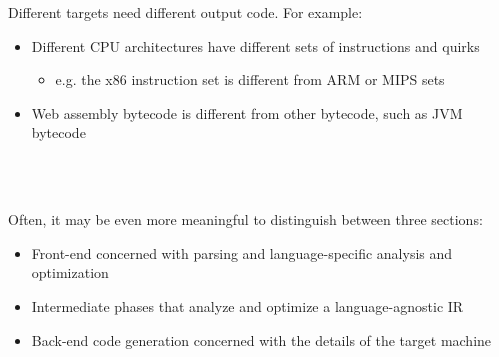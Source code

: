 \documentclass[../index.tex]{subfiles}
\begin{document}
\begin{frame}{\currenttitle}
  Different targets need different output code. For example:

  \begin{itemize}
    \item<2-> Different CPU architectures have different sets of instructions and quirks
      \begin{itemize}
        \item e.g. the x86 instruction set is different from ARM or MIPS sets
      \end{itemize}
    \item<3-> Web assembly bytecode is different from other bytecode, such as JVM bytecode
  \end{itemize}

  \vspace*{1em}
\end{frame}

\begin{frame}{\currenttitle}
   \\[2em]

   \\[1em]
    
  \hspace*{2em}

\end{frame}

\begin{frame}{\currenttitle}
  Often, it may be even more meaningful to distinguish between three sections:

  \begin{itemize}
    \item<+-> Front-end concerned with parsing and language-specific analysis
      and optimization
    \item<+-> Intermediate phases that analyze and optimize a language-agnostic
      IR
    \item<+-> Back-end code generation concerned with the details of the target
      machine
  \end{itemize}
\end{frame}
\end{document}
